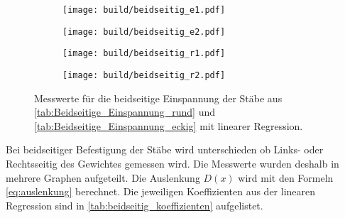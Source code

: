 \begin{figure}[h!]
    \centering
    \begin{subfigure}{0.49\textwidth}
        \centering
        \texttt{[image: build/beidseitig\_e1.pdf]}
        \label{fig:eckig_beidseitig1}
    \end{subfigure}
    \begin{subfigure}{0.49\textwidth}
        \centering
        \texttt{[image: build/beidseitig\_e2.pdf]}
        \label{fig:eckig_beidseitig2}
    \end{subfigure}
    \centering
    \begin{subfigure}{0.49\textwidth}
        \centering
        \texttt{[image: build/beidseitig\_r1.pdf]}
        \label{fig:rund_beidseitig1}
    \end{subfigure}
    \begin{subfigure}{0.49\textwidth}
        \centering
        \texttt{[image: build/beidseitig\_r2.pdf]}
        \label{fig:rund_beidseitig2}
    \end{subfigure}
    \caption{Messwerte für die beidseitige Einspannung der Stäbe aus \autoref{tab:Beidseitige_Einspannung_rund} und \autoref{tab:Beidseitige_Einspannung_eckig} mit linearer Regression.}
    \label{fig:beidseitig}
\end{figure}
\newpage
Bei beidseitiger Befestigung der Stäbe wird unterschieden ob Links- oder Rechtsseitig des Gewichtes gemessen wird.
Die Messwerte wurden deshalb in mehrere Graphen aufgeteilt. %
Die Auslenkung $D(x)$ wird mit den Formeln \eqref{eq:auslenkung} berechnet.
Die jeweiligen Koeffizienten aus der linearen Regression sind in \autoref{tab:beidseitig_koeffizienten} aufgelistet.
